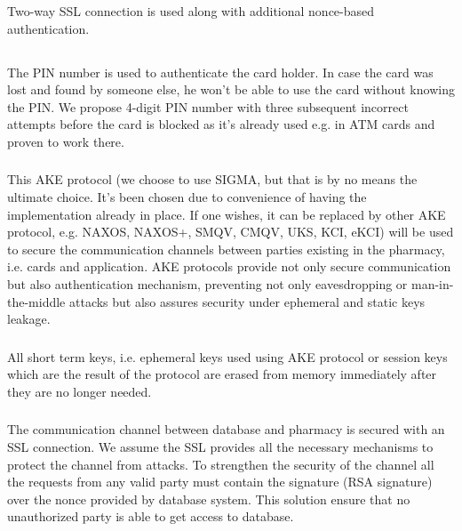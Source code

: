\subsubsection{}
Two-way SSL connection is used along with additional nonce-based authentication.

\subsection{}

\subsubsection{}
The PIN number is used to authenticate the card holder. In case the card was lost and found by someone else, he won't be able to use the card without knowing the PIN. We propose 4-digit PIN number with three subsequent incorrect attempts before the card is blocked as it's already used e.g. in ATM cards and proven to work there.

\subsubsection{}
This AKE protocol (we choose to use SIGMA, but that is by no means the ultimate choice. It's been chosen due to convenience of having the implementation already in place. If one wishes, it can be replaced by other AKE protocol, e.g. NAXOS, NAXOS+, SMQV, CMQV, UKS, KCI, eKCI) will be used to secure the communication channels between parties existing in the pharmacy, i.e. cards and application. AKE protocols provide not only secure communication but also authentication mechanism, preventing not only eavesdropping or man-in-the-middle attacks but also assures security under ephemeral and static keys leakage.

\subsubsection{}
All short term keys, i.e. ephemeral keys used using AKE protocol or session keys which are the result of the protocol are erased from memory immediately after they are no longer needed.

\subsubsection{}
The communication channel between database and pharmacy is secured with an SSL connection. We assume the SSL provides all the necessary mechanisms to protect the channel from attacks. To strengthen the security of the channel all the requests from any valid party must contain the signature (RSA signature) over the nonce provided by database system. This solution ensure that no unauthorized party is able to get access to database.

